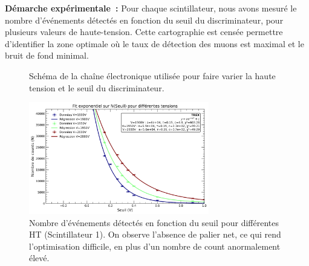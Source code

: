 \documentclass[a4paper,12pt,twoside]{article}
\begin{document}

\textbf{Démarche expérimentale~:}
Pour chaque scintillateur, nous avons mesuré le nombre d’événements détectés en fonction du seuil du discriminateur, pour plusieurs valeurs de haute-tension. Cette cartographie est censée permettre d’identifier la zone optimale où le taux de détection des muons est maximal et le bruit de fond minimal.

\begin{figure}[H]
  \centering
  
  \caption{Schéma de la chaîne électronique utilisée pour faire varier la haute tension et le seuil du discriminateur.}
  \label{fig:variation_seuil}
\end{figure}


\begin{figure}[H]
    \centering
    \includegraphics[width=0.7\textwidth]{Images/Threshold_Scintillateur_1.png}
    \caption{Nombre d’événements détectés en fonction du seuil pour différentes HT (Scintillateur 1).
    On observe l'absence de palier net, ce qui rend l'optimisation difficile, en plus d'un nombre de count anormalement élevé.}
    \label{fig:optimisation_scint1}
\end{figure}
\end{document}
